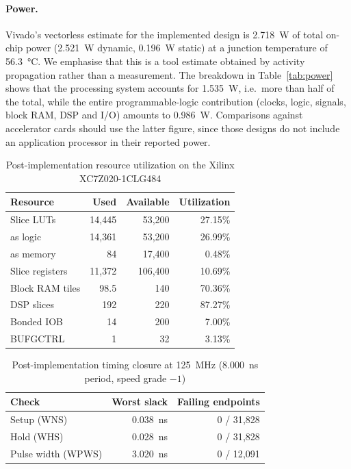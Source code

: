 \documentclass[final,5p,times,twocolumn]{elsarticle}
\begin{document}
\paragraph{Power.}
Vivado's vectorless estimate for the implemented design is \SI{2.718}{\watt} of
total on-chip power (\SI{2.521}{\watt} dynamic, \SI{0.196}{\watt} static) at a
junction temperature of \SI{56.3}{\celsius}. We emphasise that this is a tool
estimate obtained by activity propagation rather than a measurement. The
breakdown in Table~\ref{tab:power} shows that the processing system accounts for
\SI{1.535}{\watt}, i.e.\ more than half of the total, while the entire
programmable-logic contribution (clocks, logic, signals, block RAM, DSP and
I/O) amounts to \SI{0.986}{\watt}. Comparisons against accelerator cards
should use the latter figure, since those designs do not include an application
processor in their reported power.

\begin{table}[htbp]
\centering
\caption{Post-implementation resource utilization on the Xilinx XC7Z020-1CLG484}
\label{tab:resource_utilization}
\begin{tabular}{lrrr}
\toprule
Resource & Used & Available & Utilization \\
\midrule
Slice LUTs        & 14{,}445 & 53{,}200  & 27.15\% \\
\quad as logic    & 14{,}361 & 53{,}200  & 26.99\% \\
\quad as memory   &       84 & 17{,}400  &  0.48\% \\
Slice registers   & 11{,}372 & 106{,}400 & 10.69\% \\
Block RAM tiles   &     98.5 & 140       & 70.36\% \\
DSP slices        &      192 & 220       & 87.27\% \\
Bonded IOB        &       14 & 200       &  7.00\% \\
BUFGCTRL          &        1 & 32        &  3.13\% \\
\bottomrule
\end{tabular}
\end{table}

\begin{table}[htbp]
\centering
\caption{Post-implementation timing closure at \SI{125}{\mega\hertz}
(\SI{8.000}{\nano\second} period, speed grade $-1$)}
\label{tab:timing}
\begin{tabular}{lrr}
\toprule
Check & Worst slack & Failing endpoints \\
\midrule
Setup (WNS)       & \SI{0.038}{\nano\second} & 0 / 31{,}828 \\
Hold (WHS)        & \SI{0.028}{\nano\second} & 0 / 31{,}828 \\
Pulse width (WPWS)& \SI{3.020}{\nano\second} & 0 / 12{,}091 \\
\bottomrule
\end{tabular}
\end{table}
\end{document}
